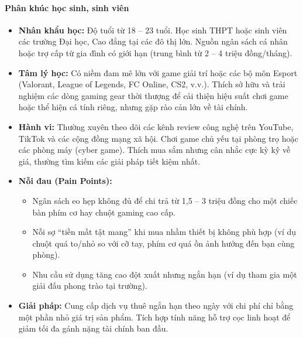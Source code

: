\paragraph{Phân khúc học sinh, sinh viên}
\begin{itemize}
    \item \textbf{Nhân khẩu học:} Độ tuổi từ 18 -- 23 tuổi. Học sinh THPT hoặc sinh viên các trường Đại học, Cao đẳng tại các đô thị lớn. Nguồn ngân sách cá nhân hoặc trợ cấp từ gia đình có giới hạn (trung bình từ 2 -- 4 triệu đồng/tháng).
    \item \textbf{Tâm lý học:} Có niềm đam mê lớn với game giải trí hoặc các bộ môn Esport (Valorant, League of Legends, FC Online, CS2, v.v.). Thích sở hữu và trải nghiệm các dòng gaming gear thời thượng để cải thiện hiệu suất chơi game hoặc thể hiện cá tính riêng, nhưng gặp rào cản lớn về tài chính.
    \item \textbf{Hành vi:} Thường xuyên theo dõi các kênh review công nghệ trên YouTube, TikTok và các cộng đồng mạng xã hội. Chơi game chủ yếu tại phòng trọ hoặc các phòng máy (cyber game). Thích mua sắm nhưng cân nhắc cực kỳ kỹ về giá, thường tìm kiếm các giải pháp tiết kiệm nhất.
    \item \textbf{Nỗi đau (Pain Points):}
    \begin{itemize}
        \item Ngân sách eo hẹp không đủ để chi trả từ 1,5 -- 3 triệu đồng cho một chiếc bàn phím cơ hay chuột gaming cao cấp.
        \item Nỗi sợ ``tiền mất tật mang'' khi mua nhầm thiết bị không phù hợp (ví dụ chuột quá to/nhỏ so với cỡ tay, phím cơ quá ồn ảnh hưởng đến bạn cùng phòng).
        \item Nhu cầu sử dụng tăng cao đột xuất nhưng ngắn hạn (ví dụ tham gia một giải đấu phong trào tại trường).
    \end{itemize}
    \item \textbf{Giải pháp:} Cung cấp dịch vụ thuê ngắn hạn theo ngày với chi phí chỉ bằng một phần nhỏ giá trị sản phẩm. Tích hợp tính năng hỗ trợ cọc linh hoạt để giảm tối đa gánh nặng tài chính ban đầu.
\end{itemize}

